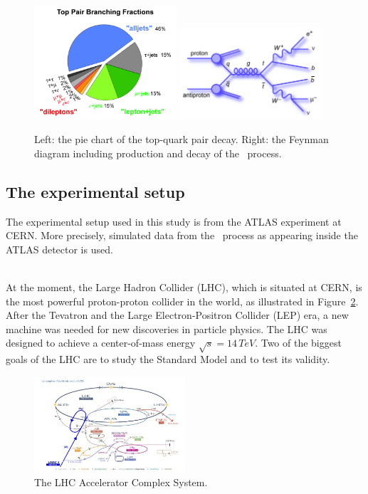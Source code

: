 \begin{figure}[h]
  \centering
  \includegraphics[width=0.47\textwidth]{../presentation/plots/ttbar_5.png}
  \includegraphics[width=0.47\textwidth]{../presentation/plots/ttbar_4.png}
  \caption{Left: the pie chart of the top-quark pair decay. Right: the Feynman diagram including production and decay of the \ttbaremu~process.}
  \label{fig:TopQuarkDecay}
\end{figure}

\subsection{The experimental setup}
\label{sec:ExperimentalSetup}

The experimental setup used in this study is from the ATLAS experiment at CERN. More precisely, simulated data from the \ttbaremu~process as appearing inside the ATLAS detector is used.

\ \\At the moment, the Large Hadron Collider (LHC), which is situated at CERN, is the most powerful proton-proton collider in the world, as illustrated in Figure~\ref{fig:LHC}. After the Tevatron and the Large Electron-Positron Collider (LEP) era, a new machine was needed for new discoveries in particle physics. The LHC was designed to achieve a center-of-mass energy $\sqrt{s}=14\,TeV$. Two of the biggest goals of the LHC are to study the Standard Model and to test its validity.  

\begin{figure}[h]
  \centering
  \includegraphics[width=0.5\textwidth]{plots/LHC.png} 
  \caption{The LHC Accelerator Complex System.}
  \label{fig:LHC}
\end{figure}

